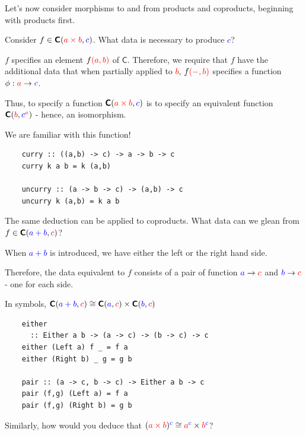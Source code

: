 \documentclass[tikz]{beamer}
\newcommand{\cat}[1]{\bm{ \mathsf{#1} }}
\newcommand{\cc}{\cat{C}}
\newcommand{\red}[1]{\textcolor{red}{#1}}
\newcommand{\mred}[1]{\textcolor{red}{$#1$}}
\newcommand{\blue}[1]{\textcolor{blue}{#1}}
\newcommand{\mblue}[1]{\textcolor{blue}{$#1$}}
\theoremstyle{definition}
\begin{document}
\frame
{
	Let's now consider morphisms to and from products and coproducts, beginning with products first. 
}

\frame
{
	Consider $f \in \cc(\red{a \times b}, \blue{c})$. What data is necessary to produce \mblue{c}? 
}

\frame
{
	$f$ specifies an element $f \red{(a,b)}$ of $\cc$. Therefore, we require that $f$ have the additional data that when partially applied to \mred{b}, $f \red{(-,b)}$ specifies a function $\phi : \red{a} \to \blue{c}$. 
}

\frame
{
	Thus, to specify a function $\cc(\red{a \times b}, \blue{c})$ is to specify an equivalent function $\cc(\red{b}, \blue{c}^{\red{a}})$ - hence, an isomorphism. 
}

\begin{frame}[fragile]

	We are familiar with this function! 
	
	\begin{verbatim}
	curry :: ((a,b) -> c) -> a -> b -> c
	curry k a b = k (a,b)
	
	uncurry :: (a -> b -> c) -> (a,b) -> c
	uncurry k (a,b) = k a b  
	\end{verbatim}
\end{frame}

\frame
{
	The same deduction can be applied to coproducts. What data can we glean from $f \in \cc(\blue{a + b}, \red{c})$? 
}

\frame
{
	When \mblue{a + b} is introduced, we have either the left or the right hand side.
	
	Therefore, the data equivalent to $f$ consists of a pair of function $\blue{a} \to \red{c}$ and $\blue{b} \to \red{c}$ - one for each side. 
}

\frame
{
	In symbols, $\cc(\blue{a + b}, \red{c}) \cong \cc(\blue{a}, \red{c}) \times \cc(\blue{b}, \red{c})$
}

\begin{frame}[fragile]
	\begin{verbatim}
	either 
	  :: Either a b -> (a -> c) -> (b -> c) -> c
	either (Left a) f _ = f a
	either (Right b) _ g = g b
	
	pair :: (a -> c, b -> c) -> Either a b -> c
	pair (f,g) (Left a) = f a
	pair (f,g) (Right b) = g b
	\end{verbatim}
\end{frame}

\frame
{
	Similarly, how would you deduce that $(\red{a \times b})^{\blue{c}} \cong \red{a}^{\blue{c}} \times \red{b}^{\blue{c}}$?
}
\end{document}
